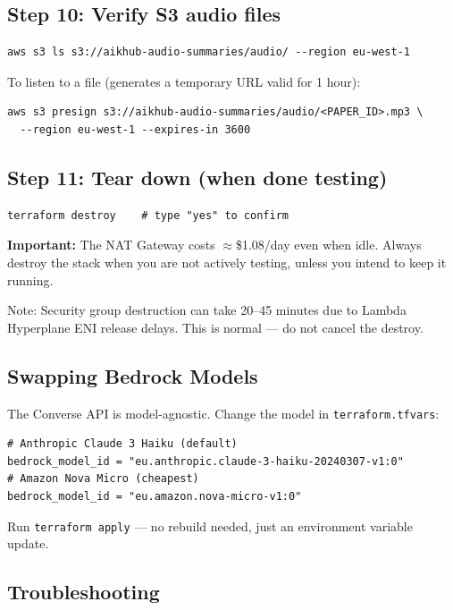 \documentclass[11pt,a4paper]{article}
\begin{document}
\subsection{Step 10: Verify S3 audio files}

\begin{lstlisting}[basicstyle=\ttfamily\small]
aws s3 ls s3://aikhub-audio-summaries/audio/ --region eu-west-1
\end{lstlisting}

To listen to a file (generates a temporary URL valid for 1 hour):
\begin{lstlisting}[basicstyle=\ttfamily\small]
aws s3 presign s3://aikhub-audio-summaries/audio/<PAPER_ID>.mp3 \
  --region eu-west-1 --expires-in 3600
\end{lstlisting}

\subsection{Step 11: Tear down (when done testing)}

\begin{lstlisting}[basicstyle=\ttfamily\small]
terraform destroy    # type "yes" to confirm
\end{lstlisting}

\textbf{Important:} The NAT Gateway costs ${\approx}$\$1.08/day even when idle. Always destroy the stack when you are not actively testing, unless you intend to keep it running.

Note: Security group destruction can take 20--45 minutes due to Lambda Hyperplane ENI release delays. This is normal --- do not cancel the destroy.

\subsection{Swapping Bedrock Models}
\label{sec:swapping-models}

The Converse API is model-agnostic. Change the model in \texttt{terraform.tfvars}:
\begin{lstlisting}[language=hcl]
# Anthropic Claude 3 Haiku (default)
bedrock_model_id = "eu.anthropic.claude-3-haiku-20240307-v1:0"
# Amazon Nova Micro (cheapest)
bedrock_model_id = "eu.amazon.nova-micro-v1:0"
\end{lstlisting}
Run \texttt{terraform apply} --- no rebuild needed, just an environment variable update.

\subsection{Troubleshooting}
\end{document}
